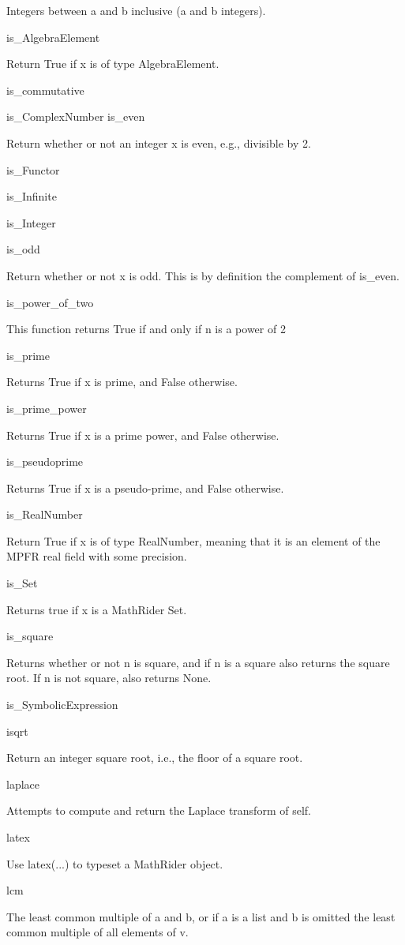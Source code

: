 \documentclass[12pt,oneside]{book}
\begin{document}
Integers between a and b inclusive (a and b integers).

is\_AlgebraElement

Return True if x is of type AlgebraElement.

is\_commutative


is\_ComplexNumber
is\_even

Return whether or not an integer x is even, e.g., divisible by 2.

is\_Functor 


is\_Infinite 


is\_Integer 


is\_odd 

Return whether or not x is odd. This is by definition the complement of is\_even.

is\_power\_of\_two

This function returns True if and only if n is a power of 2

is\_prime

Returns True if x is prime, and False otherwise.

is\_prime\_power \ \ \ \ 

Returns True if x is a prime power, and False otherwise.

is\_pseudoprime

Returns True if x is a pseudo{}-prime, and False otherwise.

is\_RealNumber

Return True if x is of type RealNumber, meaning that it is an element of the MPFR real field with some precision.

is\_Set

Returns true if x is a MathRider Set.

is\_square

Returns whether or not n is square, and if n is a square also returns the square root. If n is not square, also returns None.

is\_SymbolicExpression


isqrt

Return an integer square root, i.e., the floor of a square root.

laplace

Attempts to compute and return the Laplace transform of self.

latex

Use latex(...) to typeset a MathRider object.

lcm

The least common multiple of a and b, or if a is a list and b is omitted the least common multiple of all elements of v.
\end{document}
